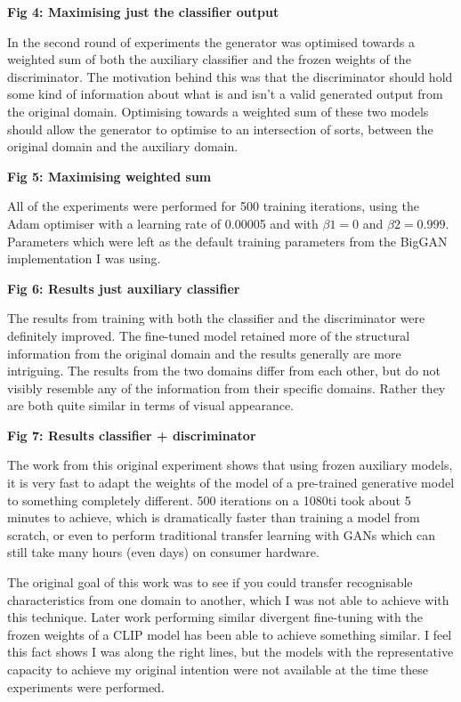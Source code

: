 \textbf{Fig 4: Maximising just the classifier output}

In the second round of experiments the generator was optimised towards a weighted sum of both the auxiliary classifier and the frozen weights of the discriminator. The motivation behind this was that the discriminator should hold some kind of information about what is and isn’t a valid generated output from the original domain. Optimising towards a weighted sum of these two models should allow the generator to optimise to an intersection of sorts, between the original domain and the auxiliary domain. 

\textbf{Fig 5: Maximising weighted sum}

All of the experiments were performed for 500 training iterations, using the Adam optimiser \citep{kingma2015adam} with a learning rate of 0.00005 and with $\beta1 = 0$ and $\beta2 = 0.999$. 
Parameters which were left as the default training parameters from the BigGAN implementation I was using. 


\textbf{Fig 6: Results just auxiliary classifier}

The results from training with both the classifier and the discriminator were definitely improved. 
The fine-tuned model retained more of the structural information from the original domain and the results generally are more intriguing. 
The results from the two domains differ from each other, but do not visibly resemble any of the information from their specific domains. 
Rather they are both quite similar in terms of visual appearance.

\textbf{Fig 7: Results classifier + discriminator}

The work from this original experiment shows that using frozen auxiliary models, it is very fast to adapt the weights of the model of a pre-trained generative model to something completely different. 
500 iterations on a 1080ti took about 5 minutes to achieve, which is dramatically faster than training a model from scratch, or even to perform traditional transfer learning with GANs which can still take many hours (even days) on consumer hardware. 

The original goal of this work was to see if you could transfer recognisable characteristics from one domain to another, which I was not able to achieve with this technique. 
Later work performing similar divergent fine-tuning with the frozen weights of a CLIP model has been able to achieve something similar. 
I feel this fact shows I was along the right lines, but the models with the representative capacity to achieve my original intention were not available at the time these experiments were performed.

